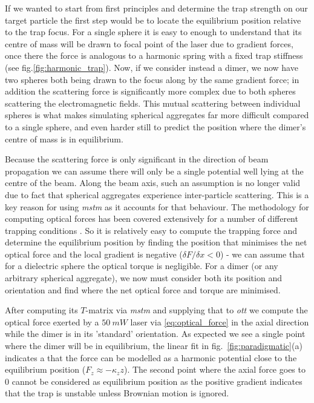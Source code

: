 If we wanted to start from first principles and determine 
the trap strength on our target particle the first step 
would be to locate the equilibrium position relative to 
the trap focus. For a single sphere it is easy to enough 
to understand that its centre of mass will be drawn to 
focal point of the laser due to gradient forces, once there 
the force is analogous to a harmonic spring with a fixed 
trap stiffness (see fig.\ref{fig:harmonic_trap}). Now, if 
we consider instead a dimer, we now have two spheres both 
being drawn to the focus along by the same gradient force; 
in addition the scattering force is significantly more complex 
due to both spheres scattering the electromagnetic fields. 
This mutual scattering between individual spheres is what 
makes simulating spherical aggregates far more difficult 
compared to a single sphere, and even harder still to 
predict the position where the dimer's centre of mass is 
in equilibrium.

Because the scattering force is only significant in the 
direction of beam propagation \cite{Capitanio2002} we 
can assume there will only be a single potential well 
lying at the centre of the beam. Along the beam axis, 
such an assumption is no longer valid due to fact that 
spherical aggregates experience inter-particle scattering. 
This is a key reason for using \textit{mstm} as it 
accounts for that behaviour. The methodology for computing 
optical forces has been covered extensively for a number 
of different trapping conditions \cite{RanhaNeves2019}. 
So it is relatively easy to compute the trapping force 
and determine the equilibrium position by finding the 
position that minimises the net optical force and the 
local gradient is negative ($\delta F/\delta x < 0$) - 
we can assume that for a dielectric sphere the optical 
torque is negligible. For a dimer (or any arbitrary 
spherical aggregate), we now must consider both its 
position and orientation and find where the net optical 
force and torque are minimised. 

After computing its $T$-matrix via \textit{mstm} and 
supplying that to \textit{ott} we compute the optical 
force exerted by a $50\ mW$ laser via \eqref{eq:optical_force} 
in the axial direction while the dimer is in its 'standard' 
orientation. As expected we see a single point where 
the dimer will be in equilibrium, the linear fit in 
fig.~\ref{fig:paradigmatic}(a) indicates a that the 
force can be modelled as a harmonic potential close to 
the equilibrium position ($F_z\approx-\kappa_z z$). 
The second point where the axial force goes to 0 cannot 
be considered as equilibrium position as the positive 
gradient indicates that the trap is unstable unless 
Brownian motion is ignored. 

